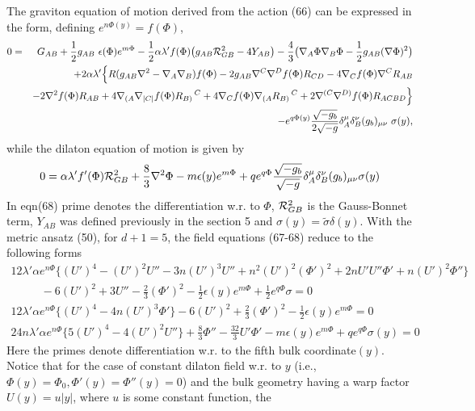 \documentclass[a4paper,12pt]{article}
\newcommand {\nn} {\nonumber}
\newcommand {\half} {\frac{1}{2}}
\begin{document}
The graviton equation of motion derived from the action (66) can be 
expressed in the form, defining $e^{n\Phi(y)}=f(\Phi)$,
\begin{eqnarray}
0&=&G_{AB}+\half g_{AB}~\epsilon(\Phi)e^{m\Phi}
-\half\alpha\lambda' f(\Phi)\big(g_{AB}{\cal R}_{GB}^2-4Y_{AB}\big)
-\frac{4}{3}\big(\nabla_A\Phi\nabla_B\Phi-\half g_{AB}(\nabla\Phi)^2\big)\nn\\
&&+2\alpha\lambda'\Big\{R(g_{AB}\nabla^2-\nabla_A\nabla_B)f(\Phi)-2g_{AB}
\nabla^C\nabla^Df(\Phi) R_{CD}-4\nabla_C f(\Phi)\nabla^C R_{AB}\nn\\
&&-2\nabla^2f(\Phi)R_{AB} + 4\nabla_{(A} \nabla_{|C|} f(\Phi) R_{B)}\,^C
+4\nabla_Cf(\Phi)\nabla_{(A} R_{B)}\,^C
+2\nabla^{(C}\nabla^{D)}f(\Phi)R_{ACBD}\Big\}\nn\\
&&-e^{q\Phi(y)}\frac{\sqrt{-g_b}}
{2\sqrt{-g}}\delta_A^{\mu}\delta_B^{\nu}(g_b)_{\mu\nu}~ \sigma(y),
\end{eqnarray}
while the dilaton equation of motion is given by 
\begin{eqnarray}
0=\alpha\lambda' f'(\Phi){\cal R}_{GB}^2+\frac{8}{3}\nabla^2\Phi-m\epsilon(y) 
e^{m\Phi}+qe^{q\Phi}\frac{\sqrt{-g_b}}{\sqrt{-g}}\delta_A^{\mu}\delta_B^{\nu}
(g_b)_{\mu\nu} \sigma(y)
\end{eqnarray}
In eqn(68) prime denotes the differentiation w.r. to $\Phi$, ${\cal R}_{GB}^2$
 is the Gauss-Bonnet term, $Y_{AB}$ was defined previously in the section 5 
and $\sigma(y)=\tilde{\sigma} \delta(y)$. With the metric ansatz (50), 
for $d+1=5$, the field equations (67-68) reduce to the following forms
\begin{eqnarray}
12\lambda'\alpha e^{n\Phi}\big\{(U')^4-(U')^2U''-3n(U')^3U''
+n^2(U')^2(\Phi')^2+2nU'U''\Phi'+n(U')^2\Phi''\big\}\nn\\
~~~~~~~~~~~~-6(U')^2+3U''-\frac{2}{3}(\Phi')^2-\frac{1}{2} 
\epsilon(y)e^{m\Phi}+\frac{1}{2} e^{q\Phi}\sigma=0\\
12\lambda'\alpha e^{n\Phi}\big\{(U')^4-4n(U')^3\Phi'\big\}
-6(U')^2+\frac{2}{3}(\Phi')^2-\half\epsilon(y) e^{m\Phi}=0\\
24n\lambda'\alpha e^{n\Phi}\big\{5(U')^4-4(U')^2U''\big\}+\frac{8}{3}
\Phi''-\frac{32}{3}U'\Phi'-m\epsilon(y) e^{m\Phi}+qe^{q\Phi}\sigma(y)=0
\end{eqnarray}
Here the primes denote differentiation w.r. to the fifth bulk coordinate$(y)$.
 Notice that for the case of constant dilaton field w.r. to $y$ 
(i.e.,$\Phi(y)=\Phi_0, \Phi'(y)=\Phi''(y)=0$) and the bulk geometry having 
a warp factor $U(y)=u|y|$, where $u$ is some constant function, the 
\end{document}
